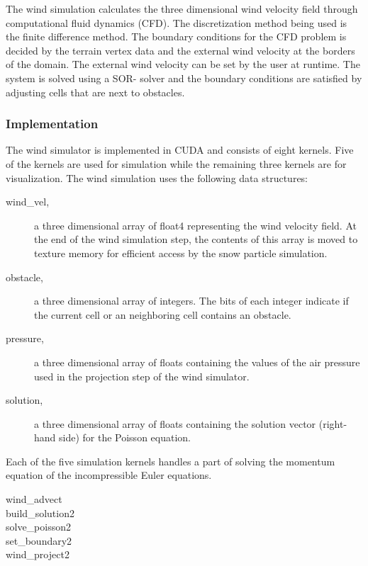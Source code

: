 The wind simulation calculates the three dimensional wind velocity field through
computational fluid dynamics (CFD). The discretization method being used is the
finite difference method. The boundary conditions for the CFD problem is decided
by the terrain vertex data and the external wind velocity at the borders of the
domain. The external wind velocity can be set by the user at runtime. The system
is solved using a SOR- solver and the boundary conditions are satisfied by
adjusting cells that are next to obstacles.

\subsubsection{Implementation}

The wind simulator is implemented in CUDA and consists of eight kernels. Five of 
the kernels are used for simulation while the remaining three kernels are for 
visualization. The wind simulation uses the following data structures:

\begin{description}
	\item[wind\_vel,] a three dimensional array of float4 representing the wind 
	velocity field. At the end of the wind simulation step, the contents of this 
	array is moved to texture memory for efficient access by the snow particle 
	simulation. 
	\item[obstacle,] a three dimensional array of integers. The bits of each 
	integer indicate if the current cell or an neighboring cell contains an 
	obstacle. 
	\item[pressure,] a three dimensional array of floats containing the values 
	of the air pressure used in the projection step of the wind simulator. 
	\item[solution,] a three dimensional array of floats containing the solution 
	vector (right-hand side) for the Poisson equation. 
\end{description}

Each of the five simulation kernels handles a part of solving the momentum equation 
of the incompressible Euler equations.
\begin{description}
	\item[wind\_advect]
	\item[build\_solution2]
	\item[solve\_poisson2]
	\item[set\_boundary2]
	\item[wind\_project2]
\end{description}

